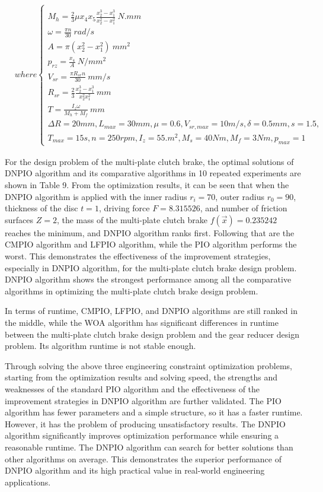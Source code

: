 \documentclass[preprint,review,compress,12pt]{elsarticle}
\begin{document}
\begin{equation}  \begin{split} 
&where\left\{\begin{matrix}\\
 M_h=\frac{2}{3}\mu x_4x_5\frac{x^3_2-x^3_1}{x^2_2-x^2_1}\ N.mm \\
 \omega = \frac{\pi n}{30}\ rad/s\\
 A =\pi (x^2_2-x^2_1)\ mm^2 \\
 p_{rz}=\frac{x_4}{A}\ N/mm^2\\
 V_{sr}=\frac{\pi R_{sr}n}{30}\ mm/s\\
 R_{sr}=\frac{2}{3} \frac{x^3_2-x^3_1}{x^2_2x^2_1}\ mm\\
 T=\frac{I_z\omega }{M_h+M_f}\ mm\\
\Delta R=20mm,L_{max}=30mm,\mu =0.6,V_{sr,max}=10m/s,\delta =0.5mm,s=1.5,\\
T_{max} = 15s,n=250rpm,I_z=55.m^2,M_s=40Nm,M_f=3Nm,p_{max}=1
\end{matrix}\right.
\end{split}  
\end{equation}

For the design problem of the multi-plate clutch brake, the optimal solutions of DNPIO algorithm and its comparative algorithms in 10 repeated experiments are shown in Table 9. From the optimization results, it can be seen that when the DNPIO algorithm is applied with the inner radius $r_i=70$, outer radius $r_0=90$, thickness of the disc $t=1$, driving force $F=8.315526$, and number of friction surfaces $Z=2$, the mass of the multi-plate clutch brake $f(\vec{x})=0.235242$ reaches the minimum, and DNPIO algorithm ranks first. Following that are the CMPIO algorithm and LFPIO algorithm, while the PIO algorithm performs the worst. This demonstrates the effectiveness of the improvement strategies, especially in DNPIO algorithm, for the multi-plate clutch brake design problem. DNPIO algorithm shows the strongest performance among all the comparative algorithms in optimizing the multi-plate clutch brake design problem.

In terms of runtime, CMPIO, LFPIO, and DNPIO algorithms are still ranked in the middle, while the WOA algorithm has significant differences in runtime between the multi-plate clutch brake design problem and the gear reducer design problem. Its algorithm runtime is not stable enough.

Through solving the above three engineering constraint optimization problems, starting from the optimization results and solving speed, the strengths and weaknesses of the standard PIO algorithm and the effectiveness of the improvement strategies in DNPIO algorithm are further validated. The PIO algorithm has fewer parameters and a simple structure, so it has a faster runtime. However, it has the problem of producing unsatisfactory results. The DNPIO algorithm significantly improves optimization performance while ensuring a reasonable runtime. The DNPIO algorithm can search for better solutions than other algorithms on average. This demonstrates the superior performance of DNPIO algorithm and its high practical value in real-world engineering applications.
\end{document}
